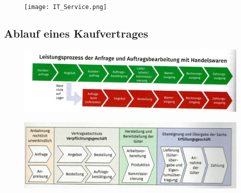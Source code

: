 \documentclass[10pt]{article}
\begin{document}
\begin{figure}[H]
\begin{center}
  \texttt{[image: IT\_Service.png]}
  \end{center}

  \label{fig:IT_Service.png}
\end{figure}

\subsection{Ablauf eines Kaufvertrages}

\begin{figure}[H]
\begin{center}
  \includegraphics[width=12cm]{Kaufvertragablauf.png}
  \end{center}
\end{figure}

\begin{figure}[H]
\begin{center}
  \includegraphics[width=12cm]{Kaufvertragablauf2.jpg}
  \end{center}
\end{figure}
\end{document}
